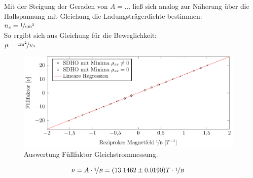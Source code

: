 Mit der Steigung der Geraden von $A=...$  %
ließ sich analog zur Näherung über die Hallspannung mit Gleichung %
die Ladungsträgerdichte bestimmen:
\\
$n_s= \unitfrac{1}{cm^2}$
\\
So ergibt sich aus Gleichung %
für die Beweglichkeit:
\\
$\mu= \unitfrac{cm^2}{Vs}$  %


\begin{figure}[h]
	\centering
	\includegraphics{graphs/dc/auswertung.pdf}
	\caption[Auswertung Füllfaktor Gleichstrommessung]{
		Auswertung Füllfaktor Gleichstrommessung.
	}
	\label{fig:dc_sdho_ausw}
\end{figure}

\begin{equation}
\nu= A\cdot \nicefrac{1}{B}=(13.1462 \pm 0.0190)T \cdot \nicefrac{1}{B}
\end{equation}